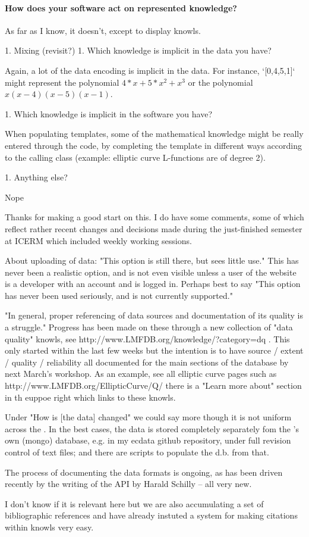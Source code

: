 \paragraph{How does your software act on represented knowledge?}

   As far as I know, it doesn't, except to display knowls.

1. Mixing (revisit?)
 1. Which knowledge is implicit in the data you have?

   Again, a lot of the data encoding is implicit in the data. For instance, `[0,4,5,1]` might represent the polynomial $4*x+5*x^2+x^3$ or the polynomial $x(x-4)(x-5)(x-1)$.

 1. Which knowledge is implicit in the software you have?

   When populating templates, some of the mathematical knowledge might be really entered through the code, by completing the template in different ways according to the calling class (example: elliptic curve L-functions are of degree 2).

1. Anything else?

 Nope

Thanks for making a good start on this.  I do have some comments, some of
which reflect rather recent changes and decisions made during the
just-finished semester at ICERM which included weekly \LMFDB working
sessions.

About uploading of data: "This option is still there, but sees little
use."  This has never been a realistic option, and is not even visible
unless a user of the website is a developer with an account and is logged
in.  Perhaps best to say "This option has never been used seriously, and is
not currently supported."

"In general, proper referencing of data sources and documentation of its
quality is a struggle."   Progress has been made on these through a new
collection of "data quality" knowls, see
http://www.LMFDB.org/knowledge/?category=dq .  This only started within the
last few weeks but the intention is to have source / extent / quality /
reliability all documented for the main sections of the database by next
March's workshop.  As an example, see all elliptic curve pages such as
http://www.LMFDB.org/EllipticCurve/Q/  there is a "Learn more about"
section in th euppoe right which links to these knowls.

Under "How is [the data] changed" we could say more though it is not
uniform across the \LMFDB.  In the best cases, the data is stored completely
separately fom the \LMFDB's own (mongo) database, e.g. in my ecdata github
repository, under full revision control of text files;  and there are
scripts to populate the d.b. from that.

The process of documenting the data formats is ongoing, as has been driven
recently by the writing of the API by Harald Schilly -- all very new.

I don't know if it is relevant here but we are also accumulating a set of
bibliographic references and have already instuted a system for making
citations within knowls very easy.
